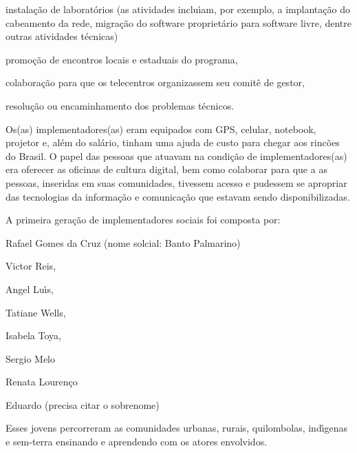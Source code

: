 \documentclass[
12pt,		%
openright,	%
twoside,  %
a4paper,			%
chapter=TITLE,		%
english,			%
french,				%
spanish,			%
brazil				%
]{USPSC-classe/USPSC}
\begin{document}
\begin{alineas}
\item instala\c{c}\~ao de laborat\'orios (as atividades inclu\'{\i}am, por exemplo, a implanta\c{c}\~ao do cabeamento da rede, migra\c{c}\~ao do software propriet\'ario para software livre, dentre outras atividades t\'ecnicas)
\item promo\c{c}\~ao de encontros locais e estaduais do programa,
\item colabora\c{c}\~ao para que os telecentros organizassem seu  comit\^e de gestor,
\item resolu\c{c}\~ao ou encaminhamento dos problemas  t\'ecnicos.
\end{alineas}

Os(as) implementadores(as) eram equipados com GPS, celular, notebook, projetor  e, al\'em do sal\'ario, tinham uma ajuda de custo para chegar aos rinc\~oes do Brasil. O papel das pessoas que atuavam na condi\c{c}\~ao de implementadores(as) era oferecer as oficinas de cultura digital, bem como colaborar para que a as pessoas, inseridas em suas comunidades, tivessem acesso e pudessem se apropriar das tecnologias da informa\c{c}\~ao e comunica\c{c}\~ao que estavam sendo disponibilizadas.










A  primeira gera\c{c}\~ao de implementadores  sociais foi composta por:











\begin{alineas}
\item Rafael Gomes da Cruz (nome solcial: Banto Palmarino)
\item Victor Reis,
\item Angel Lu\'{\i}s,
\item Tatiane Wells,
\item Isabela Toya,
\item Sergio Melo
\item Renata Louren\c{c}o
\item Eduardo (precisa citar o sobrenome)
\end{alineas}

Esses jovens percorreram as comunidades urbanas, rurais, quilombolas, ind\'{\i}genas e sem-terra ensinando e aprendendo com os atores envolvidos.
\end{document}

